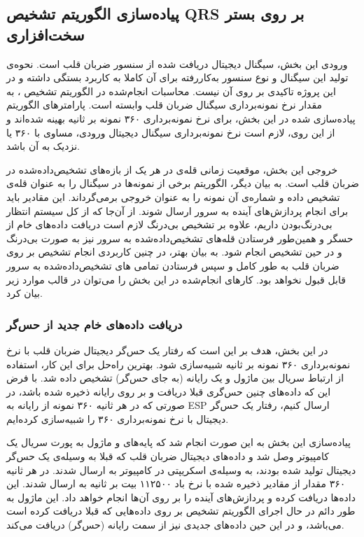 	\subsection{پیاده‌سازی الگوریتم تشخیص QRS بر روی بستر سخت‌افزاری}
	
ورودی این بخش، سیگنال دیجیتال دریافت شده از سنسور ضربان قلب است. نحوه‌ی تولید این سیگنال و نوع سنسور به‌کاررفته برای آن کاملا به کاربرد بستگی داشته و در این پروژه تاکیدی بر روی آن نیست. محاسبات انجام‌شده در الگوریتم تشخیص ، به مقدار نرخ نمونه‌برداری سیگنال ضربان قلب وابسته است. پارامترهای الگوریتم پیاده‌سازی شده در این بخش، برای نرخ نمونه‌برداری ۳۶۰ نمونه بر ثانیه بهینه شده‌اند و از این روی، لازم است نرخ نمونه‌برداری سیگنال دیجیتال ورودی، مساوی با ۳۶۰ یا نزدیک به آن باشد.

خروجی این بخش، موقعیت زمانی قله‌ی  در هر یک از بازه‌های  تشخیص‌داده‌شده در ضربان قلب است. به بیان دیگر، الگوریتم برخی از نمونه‌ها در سیگنال را به عنوان قله‌ی  تشخیص داده و شماره‌ی آن نمونه را به عنوان خروجی برمی‌گرداند. این مقادیر باید برای انجام پردازش‌های آینده به سرور ارسال شوند. از آن‌جا که از کل سیستم انتظار بی‌درنگ‌بودن داریم، علاوه بر تشخیص بی‌درنگ  لازم است دریافت داد‌ه‌های خام از حسگر و همین‌طور فرستادن قله‌های  تشخیص‌داده‌شده به سرور نیز به صورت بی‌درنگ و در حین تشخیص  انجام شود. به بیان بهتر، در چنین کاربردی انجام تشخیص  بر روی ضربان قلب به طور کامل و سپس فرستادن تمامی های تشخیص‌داده‌شده به سرور قابل قبول نخواهد بود.
کارهای انجام‌شده در این بخش را می‌توان در قالب موارد زیر بیان کرد. 
\subsubsection{دریافت داده‌های خام جدید از حس‌گر}
در این بخش، هدف بر این است که رفتار یک حس‌گر دیجیتال ضربان قلب با نرخ نمونه‌برداری ۳۶۰ نمونه بر ثانیه شبیه‌سازی شود. بهترین راه‌حل برای این کار، استفاده از ارتباط سریال بین ماژول و یک رایانه (به جای حس‌گر) تشخیص داده شد. با فرض این که داده‌های چنین حس‌گری قبلا دریافت و بر روی رایانه ذخیره شده باشد، در صورتی که در هر ثانیه ۳۶۰ نمونه از رایانه به ESP ارسال کنیم، رفتار یک حس‌گر دیجیتال با نرخ نمونه‌برداری ۳۶۰ را شبیه‌سازی کرده‌ایم.

پیاده‌سازی این بخش به این صورت انجام شد که پایه‌های  و  ماژول  به پورت سریال یک کامپیوتر وصل شد و داده‌های دیجیتال ضربان قلب که قبلا به وسیله‌ی یک حس‌گر دیجیتال تولید شده بودند،‌ به وسیله‌ی اسکریپتی در کامپیوتر به  ارسال شدند. در هر ثانیه ۳۶۰ مقدار از مقادیر ذخیره شده با نرخ باد ۱۱۲۵۰۰ بیت بر ثانیه به  ارسال شدند.  این داده‌ها دریافت کرده و پردازش‌های آینده را بر روی آن‌ها انجام خواهد داد. این ماژول به طور دائم در حال اجرای الگوریتم تشخیص  بر روی داده‌هایی که قبلا دریافت کرده است می‌باشد، و در این حین داده‌های جدیدی نیز از سمت رایانه (حس‌گر) دریافت می‌کند.
